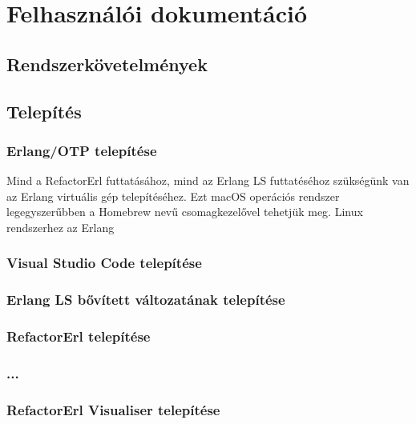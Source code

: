 \chapter{Felhasználói dokumentáció}
\label{ch:user}

\section{Rendszerkövetelmények}
\section{Telepítés}
\subsection{Erlang/OTP telepítése}

Mind a RefactorErl futtatásához, mind az Erlang LS futtatéséhoz szükségünk van az Erlang virtuális gép telepítéséhez. Ezt macOS operációs rendszer legegyszerűbben a Homebrew \cite{brewErlang}  nevű csomagkezelővel tehetjük meg. Linux rendszerhez az Erlang \cite{erlangDownloads} 


\subsection{Visual Studio Code telepítése}
\subsection{Erlang LS bővített változatának telepítése}
\subsection{RefactorErl telepítése}
\subsection{...}
\subsection{RefactorErl Visualiser telepítése}

\subsection{}